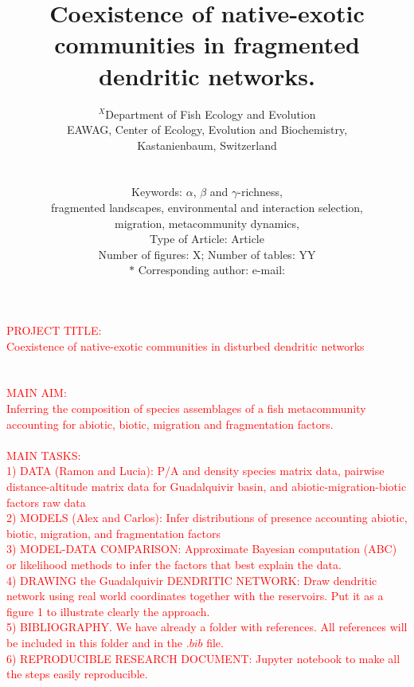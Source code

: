 \documentclass[12pt]{article}
\newcommand{\carlos}[1]{\textcolor{Red}{#1}}
\begin{document}
\title{{\bf Coexistence of native-exotic communities in fragmented dendritic networks.}} \author{$^X$Department of Fish Ecology and Evolution \\
  EAWAG, Center of Ecology, Evolution and Biochemistry,\\ Kastanienbaum, Switzerland\\
  \\
  \\
  Keywords: $\alpha$, $\beta$ and $\gamma$-richness,\\
  fragmented landscapes, environmental and interaction selection,\\ migration, metacommunity dynamics,\\
  Type of Article: Article\\
  Number of figures: X; Number of tables: YY\\
  $\ast$ Corresponding author: e-mail:}
  
\carlos{PROJECT TITLE: \\ Coexistence of native-exotic communities in disturbed dendritic networks\\
  \\
  \\
  MAIN AIM: \\
  Inferring the composition of species assemblages of a fish metacommunity accounting for abiotic, biotic, migration and fragmentation factors.
  \\
  \\
  MAIN TASKS:\\
  1) DATA (Ramon and Lucia): P/A and density species matrix data, pairwise distance-altitude matrix data for Guadalquivir basin, and abiotic-migration-biotic factors raw data\\
  2) MODELS (Alex and Carlos): Infer distributions of presence accounting abiotic, biotic, migration, and fragmentation factors\\
  3) MODEL-DATA COMPARISON: Approximate Bayesian computation (ABC) or likelihood methods to infer the factors that best explain the data.\\
  4) DRAWING the Guadalquivir DENDRITIC NETWORK: Draw dendritic network using real world coordinates together with the reservoirs. Put it as a figure 1 to illustrate clearly the approach.\\
  5) BIBLIOGRAPHY. We have already a folder with references. All references will be included in this folder and in the $.bib$ file.\\
  6) REPRODUCIBLE RESEARCH DOCUMENT: Jupyter notebook to make all the steps easily reproducible.}
  
\end{document}
